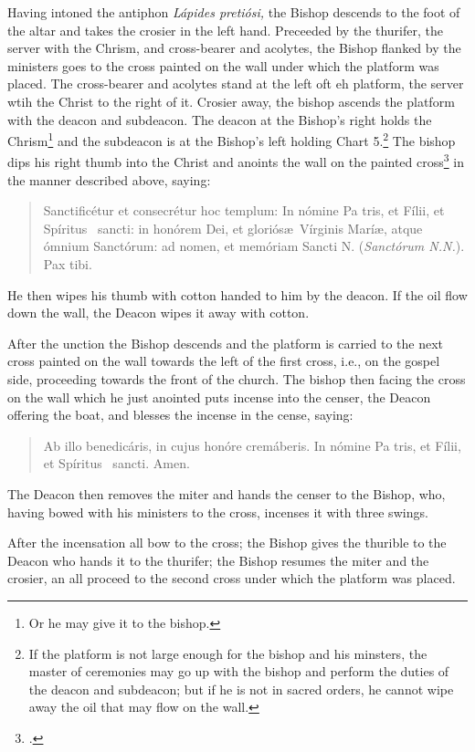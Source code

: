 \documentclass[letterpaper]{report}
\newcommand\blessincense{
\begin{quote}
   Ab illo benedicáris, in cujus honóre cremáberis. In nómine Pa\cross
    tris, et Fí\cross lii, et Spíritus \cross\ sancti. \rbar Amen.
\end{quote}
}
\begin{document}
{\rubric Having intoned the antiphon \textit{Lápides pretiósi,} the Bishop
descends to the foot of the altar and takes the crosier in the left hand.
Preceeded by the thurifer, the server with the Chrism, and cross-bearer and
acolytes, the Bishop flanked by the ministers goes to the cross painted on the
wall under which the platform was placed. The cross-bearer and acolytes stand
at the left oft eh platform, the server wtih the Christ to the right of it.
Crosier away, the bishop ascends the platform with the deacon and subdeacon.
The deacon at the Bishop's right holds the Chrism\footnote{Or he may give it to
the bishop.} and the subdeacon is at the Bishop's left holding Chart
5.\footnote{If the platform is not large enough for the bishop and his
minsters, the master of ceremonies may go up with the bishop and perform the
duties of the deacon and subdeacon; but if he is not in sacred orders, he
cannot wipe away the oil that may flow on the wall.} The bishop dips his right
thumb into the Christ and anoints the wall on the painted
cross\footcite[\textit{Above} or \textit{below} the cross, if it be of marble
or metal. See][note 2, p. 112.]{stehle} in the manner described above, saying:

\begin{quote}
    Sancti\cross ficétur et conse\cross crétur hoc templum: In nómine Pa\cross
    tris, et Fí\cross lii, et Spíritus \cross\ sancti: in honórem Dei, et
    gloriós\ae\ Vírginis Marí\ae, atque ómnium Sanctórum: ad nomen, et memóriam
    Sancti N. (\textit{Sanctórum N.N.}). Pax tibi.
\end{quote}

He then wipes his thumb with cotton handed to him by the deacon. If the oil
flow down the wall, the Deacon wipes it away with cotton.

After the unction the Bishop descends and the platform is carried to the next
cross painted on the wall towards the left of the first cross, i.e., on the
gospel side, proceeding towards the front of the church. The bishop then facing
the cross on the wall which he just anointed puts incense into the censer, the
Deacon offering the boat, and blesses the incense in the cense, saying: 

\blessincense

The Deacon then removes the miter and hands the censer to the Bishop, who,
having bowed with his ministers to the cross, incenses it with three swings.

After the incensation all bow to the cross; the Bishop gives the thurible to
the Deacon who hands it to the thurifer; the Bishop resumes the miter and the
crosier, an all proceed to the second cross under which the platform was
placed.

}
\end{document}
